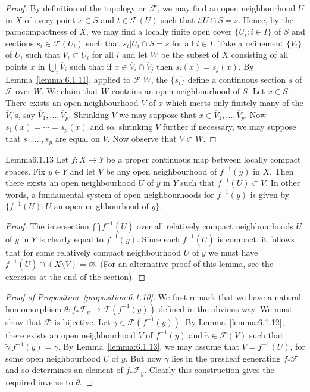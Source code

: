 \begin{proof}
By definition of the topology on $\mathcal F$, we may find an open neighbourhood $U$ in $X$ of every point $x\in S$ and $t\in\mathcal F(U)$ such that $t|U\cap S=s$. Hence, by the paracompactness of $X$, we may find a locally finite open cover $\{U_i:i\in I\}$ of $S$ and sections $s_i\in\mathcal F(U_i)$ such that $s_i|U_i\cap S=s$ for all $i\in I$. Take a refinement $\{V_i\}$ of $U_i$ such that $\overline V_i\subset U_i$ for all $i$ and let $W$ be the subset of $X$ consisting of all points $x$ in $\bigcup_i\overline V_i$ such that if $x\in\overline V_i\cap\overline V_j$ then $s_i(x)=s_j(x)$. By Lemma~\ref{lemma:6.1.11},
applied to $\mathcal F|W$, the $\{s_i\}$ define a continuous section $\widetilde s$ of $\mathcal F$ over $W$. We claim that $W$ contains an open neighbourhood of $S$. Let $x\in S$. There exists an open neighbourhood $V$ of $x$ which meets only finitely many of the $\overline V_i$'s, say $\overline V_1,\ldots,\overline V_p$. Shrinking $V$ we may suppose that $x\in\overline V_1,\ldots,\overline V_p$. Now $s_1(x)=\cdots=s_p(x)$ and so, shrinking $V$ further if necessary, we may suppose that $s_1,\ldots,s_p$ are equal on $V$. Now observe that $V\subset W$.
\end{proof}
\begin{originaltheorem}{Lemma}{6.1.13}
Let $f:X\to Y$ be a proper continuous map between locally compact spaces. Fix $y\in Y$ and let $V$ be any open neighbourhood of $f^{-1}(y)$ in $X$. Then there exists an open neighbourhood $U$ of $y$ in $Y$ such that $f^{-1}(U)\subset V$. In other words, a fundamental system of open neighbourhoods for $f^{-1}(y)$ is given by $\{f^{-1}(U):U\text{ an open neighbourhood of }y\}$.
\end{originaltheorem}
\begin{proof}
The intersection $\bigcap f^{-1}(\overline U)$ over all relatively compact neighbourhoods $U$ of $y$ in $Y$ is clearly equal to $f^{-1}(y)$. Since each $f^{-1}(\overline U)$ is compact, it follows that for some relatively compact neighbourhood $U$ of $y$ we must have $f^{-1}(\overline U)\cap(X\setminus V)=\varnothing$. (For an alternative proof of this lemma, see the exercises at the end of the section).
\end{proof}
\begin{proof}[Proof of Proposition~\ref{proposition:6.1.10}]
We first remark that we have a natural homomorphism $\theta:f_*\mathcal F_y\to\mathcal F(f^{-1}(y))$ defined in the obvious way. We must show that $\mathcal F$ is bijective. Let $\gamma\in\mathcal F(f^{-1}(y))$. By Lemma~\ref{lemma:6.1.12}, there exists an open neighbourhood $V$ of $f^{-1}(y)$ and $\widetilde\gamma\in\mathcal F(V)$ such that $\widetilde\gamma|f^{-1}(y)=\gamma$. By Lemma~\ref{lemma:6.1.13}, we may assume that $V=f^{-1}(U)$, for some open neighbourhood $U$ of $y$. But now $\widetilde\gamma$ lies in the presheaf generating $f_*\mathcal F$ and so determines an element of $f_*\mathcal F_y$. Clearly this construction gives the required inverse to $\theta$.
\end{proof}
